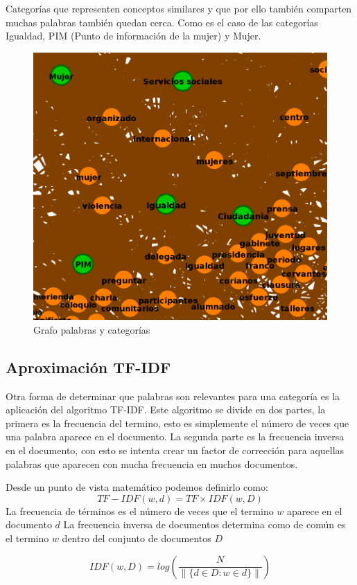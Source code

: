Categorías que representen conceptos similares y que por ello también comparten muchas palabras también quedan cerca. Como es el caso de las categorías Igualdad, PIM (Punto de información de la mujer) y Mujer.


\begin{figure}[!htbp]
\begin{center}
\includegraphics[scale=0.33]{Categorias/palabras_clave/cat_similares.png} 
\caption{Grafo palabras y categorías}
\end{center}
\end{figure}



\subsection{Aproximación TF-IDF}

Otra forma de determinar que palabras son relevantes para una categoría es la aplicación del algoritmo TF-IDF. Este algoritmo se divide en dos partes, la primera es la frecuencia del termino, esto es simplemente el número de veces que una palabra aparece en el documento. La segunda parte es la frecuencia inversa en el documento, con esto se intenta crear un factor de corrección para aquellas palabras que aparecen con mucha frecuencia en muchos documentos.

Desde un punto de vista matemático podemos definirlo como:
\begin{equation}
  TF-IDF(w,d) = TF \times IDF(w,D)
\end{equation}
La frecuencia de términos es el número de veces que el termino $w$ aparece en el documento $d$
La frecuencia inversa de documentos determina como de común es el termino $w$ dentro del conjunto de documentos $D$

\begin{equation}
  IDF(w,D) = log(\frac{N}{\|\{d \in D : w \in d \}\|})
\end{equation}